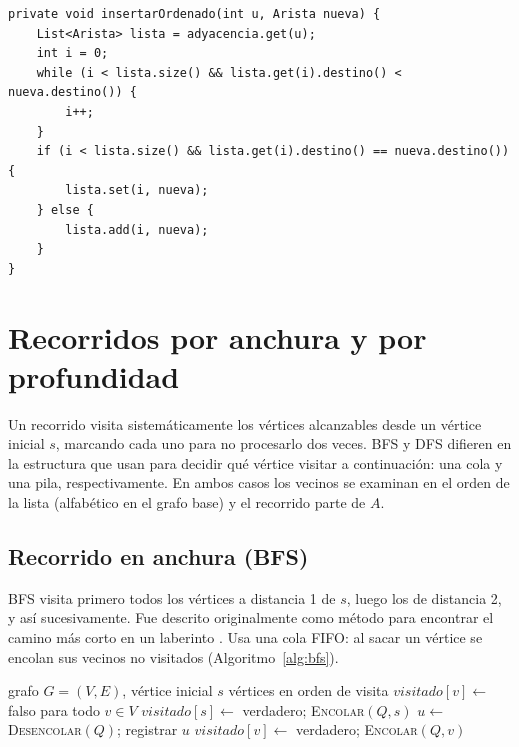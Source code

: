 \documentclass[conference]{IEEEtran}
\begin{document}
\noindent\begin{minipage}{\columnwidth}
\begin{lstlisting}[caption={Lista: inserción ordenada (\texttt{GrafoLista}).},label={lst:lista}]
private void insertarOrdenado(int u, Arista nueva) {
    List<Arista> lista = adyacencia.get(u);
    int i = 0;
    while (i < lista.size() && lista.get(i).destino() < nueva.destino()) {
        i++;
    }
    if (i < lista.size() && lista.get(i).destino() == nueva.destino()) {
        lista.set(i, nueva);
    } else {
        lista.add(i, nueva);
    }
}
\end{lstlisting}
\end{minipage}\par\medskip

\section{Recorridos por anchura y por profundidad}
\label{sec:recorridos}
Un recorrido visita sistemáticamente los vértices alcanzables desde un vértice inicial $s$, marcando cada uno para no procesarlo dos veces. BFS y DFS difieren en la estructura que usan para decidir qué vértice visitar a continuación: una cola y una pila, respectivamente. En ambos casos los vecinos se examinan en el orden de la lista (alfabético en el grafo base) y el recorrido parte de $A$.

\subsection{Recorrido en anchura (BFS)}
BFS visita primero todos los vértices a distancia 1 de $s$, luego los de distancia 2, y así sucesivamente. Fue descrito originalmente como método para encontrar el camino más corto en un laberinto \cite{moore}. Usa una cola FIFO: al sacar un vértice se encolan sus vecinos no visitados (Algoritmo~\ref{alg:bfs}).

\begin{algorithm}[t]
\caption{BFS$(G,s)$}
\label{alg:bfs}
\begin{algorithmic}[1]
\Require grafo $G=(V,E)$, vértice inicial $s$
\Ensure vértices en orden de visita
\State $visitado[v]\gets$ falso para todo $v\in V$
\State $visitado[s]\gets$ verdadero; \textsc{Encolar}$(Q,s)$
  \State $u\gets$ \textsc{Desencolar}$(Q)$; registrar $u$
      \State $visitado[v]\gets$ verdadero; \textsc{Encolar}$(Q,v)$
    \EndIf
  \EndFor
\EndWhile
\end{algorithmic}
\end{algorithm}
\end{document}
